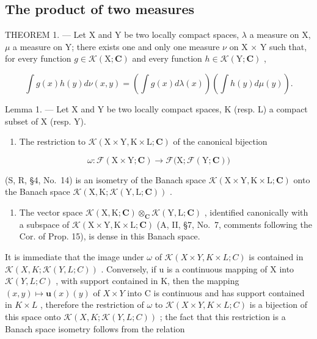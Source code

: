 \subsection{The product of two measures}

THEOREM 1. --- Let X and Y be two locally compact spaces, \(\lambda\) a measure on X, \(\mu\) a measure on Y; there exists one and only one measure \(\nu\) on X \(\times\) Y such that, for every function \(g \in \mathcal{K}(\mathrm{X};\mathbf{C})\) and every function \(h \in \mathcal{K}(\mathrm{Y};\mathbf{C})\) ,

\[
\int g (x) h (y) d \nu (x, y) = \left(\int g (x) d \lambda (x)\right) \left(\int h (y) d \mu (y)\right).\tag{1}
\]

Lemma 1. --- Let X and Y be two locally compact spaces, K (resp. L) a compact subset of X (resp. Y).

\begin{enumerate}
\def\labelenumi{(\roman{enumi})}
\tightlist
\item
  The restriction to \(\mathcal{K}(\mathrm{X}\times \mathrm{Y},\mathrm{K}\times \mathrm{L};\mathbf{C})\) of the canonical bijection
\end{enumerate}

\[
\omega : \mathcal {F} (\mathrm{X} \times \mathrm{Y}; \mathbf {C}) \rightarrow \mathcal {F} \bigl (\mathrm{X}; \mathcal {F} (\mathrm{Y}; \mathbf {C}) \bigr)
\]

(S, R, §4, No.~14) is an isometry of the Banach space \(\mathcal{K}(\mathrm{X}\times\mathrm{Y},\mathrm{K}\times\mathrm{L};\mathbf{C})\) onto the Banach space \(\mathcal{K}(\mathrm{X},\mathrm{K};\mathcal{K}(\mathrm{Y},\mathrm{L};\mathbf{C}))\) .

\begin{enumerate}
\def\labelenumi{(\roman{enumi})}
\setcounter{enumi}{1}
\tightlist
\item
  The vector space \(\mathcal{K}(\mathrm{X},\mathrm{K};\mathbf{C})\otimes_{\mathbf{C}}\mathcal{K}(\mathrm{Y},\mathrm{L};\mathbf{C})\) , identified canonically with a subspace of \(\mathcal{K}(\mathrm{X}\times \mathrm{Y},\mathrm{K}\times \mathrm{L};\mathbf{C})\) (A, II, §7, No.~7, comments following the Cor. of Prop. 15), is dense in this Banach space.
\end{enumerate}

It is immediate that the image under \(\omega\) of \(\mathcal{K}(X\times Y,K\times L;C)\) is contained in \(\mathcal{K}(X,K;\mathcal{K}(Y,L;C))\) . Conversely, if u is a continuous mapping of X into \(\mathcal{K}(Y,L;C)\) , with support contained in K, then the mapping \((x,y)\mapsto\mathbf{u}(x)(y)\) of \(X\times Y\) into C is continuous and has support contained in \(K\times L\) , therefore the restriction of \(\omega\) to \(\mathcal{K}(X\times Y,K\times L;C)\) is a bijection of this space onto \(\mathcal{K}(X,K;\mathcal{K}(Y,L;C))\) ; the fact that this restriction is a Banach space isometry follows from the relation

